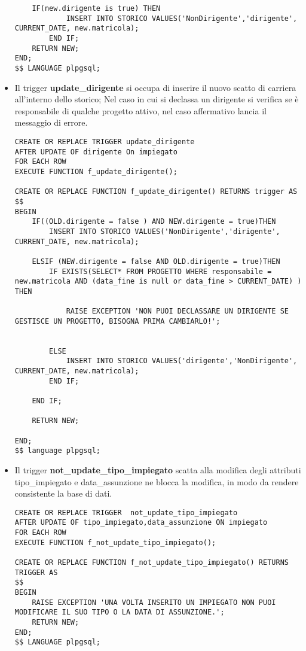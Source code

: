 \begin{itemize}
\begin{lstlisting}
    IF(new.dirigente is true) THEN
            INSERT INTO STORICO VALUES('NonDirigente','dirigente', CURRENT_DATE, new.matricola);
        END IF;
    RETURN NEW;
END;
$$ LANGUAGE plpgsql;
\end{lstlisting}

\normalsize
\item Il trigger \textbf{update\_dirigente} si occupa di inserire il nuovo scatto di carriera all'interno dello storico; Nel caso in cui si declassa un dirigente si verifica se è responsabile di qualche progetto attivo, nel caso affermativo lancia il messaggio di errore.

\scriptsize
\begin{lstlisting}
CREATE OR REPLACE TRIGGER update_dirigente
AFTER UPDATE OF dirigente On impiegato
FOR EACH ROW
EXECUTE FUNCTION f_update_dirigente();

CREATE OR REPLACE FUNCTION f_update_dirigente() RETURNS trigger AS
$$
BEGIN
	IF((OLD.dirigente = false ) AND NEW.dirigente = true)THEN
		INSERT INTO STORICO VALUES('NonDirigente','dirigente', CURRENT_DATE, new.matricola);

	ELSIF (NEW.dirigente = false AND OLD.dirigente = true)THEN
		IF EXISTS(SELECT* FROM PROGETTO WHERE responsabile = new.matricola AND (data_fine is null or data_fine > CURRENT_DATE) ) THEN

			RAISE EXCEPTION 'NON PUOI DECLASSARE UN DIRIGENTE SE GESTISCE UN PROGETTO, BISOGNA PRIMA CAMBIARLO!';


		ELSE
			INSERT INTO STORICO VALUES('dirigente','NonDirigente', CURRENT_DATE, new.matricola);
		END IF;

	END IF;

	RETURN NEW;

END;
$$ language plpgsql;
\end{lstlisting}
\newpage
\normalsize
\item Il trigger \textbf{not\_update\_tipo\_impiegato} scatta alla modifica degli attributi tipo\_impiegato e data\_assunzione ne blocca la modifica, in modo da rendere consistente la base di dati.
\scriptsize
\begin{lstlisting}
CREATE OR REPLACE TRIGGER  not_update_tipo_impiegato
AFTER UPDATE OF tipo_impiegato,data_assunzione ON impiegato
FOR EACH ROW
EXECUTE FUNCTION f_not_update_tipo_impiegato();

CREATE OR REPLACE FUNCTION f_not_update_tipo_impiegato() RETURNS TRIGGER AS
$$
BEGIN
	RAISE EXCEPTION 'UNA VOLTA INSERITO UN IMPIEGATO NON PUOI MODIFICARE IL SUO TIPO O LA DATA DI ASSUNZIONE.';
	RETURN NEW;
END;
$$ LANGUAGE plpgsql;
\end{lstlisting}


\end{itemize}
